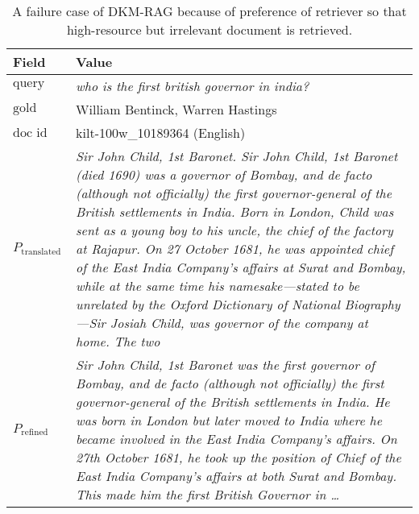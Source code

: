 \begin{table*}[ht]
\centering
\begin{tabularx}{\textwidth}{lX}
\hline
\textbf{Field} & \textbf{Value} \\
\hline
\(\displaystyle \text{query}\) & \textit{who is the first british governor in india?} \\
\hline
\(\displaystyle \text{gold answer}\) & William Bentinck, Warren Hastings \\
\hline
\(\displaystyle \text{doc id}\) & kilt-100w\_10189364 (English) \\
\hline
\(\displaystyle P_{\text{translated}}\) & \textit{Sir John Child, 1st Baronet. Sir John Child, 1st Baronet (died 1690) was a governor of Bombay, and de facto (although not officially) the first governor-general of the British settlements in India. Born in London, Child was sent as a young boy to his uncle, the chief of the factory at Rajapur. On 27 October 1681, he was appointed chief of the East India Company's affairs at Surat and Bombay, while at the same time his namesake—stated to be unrelated by the Oxford Dictionary of National Biography—Sir Josiah Child, was governor of the company at home. The two} \\
\hline
\(\displaystyle P_{\text{refined}}\) & \textit{Sir John Child, 1st Baronet was the first governor of Bombay, and de facto (although not officially) the first governor-general of the British settlements in India. He was born in London but later moved to India where he became involved in the East India Company’s affairs. On 27th October 1681, he took up the position of Chief of the East India Company’s affairs at both Surat and Bombay. This made him the first British Governor in \ldots} \\
\hline
\end{tabularx}
\caption{A failure case of DKM-RAG because of preference of retriever so that high-resource but irrelevant document is retrieved. }
\label{tab:failure_dkmrag}
\end{table*}
